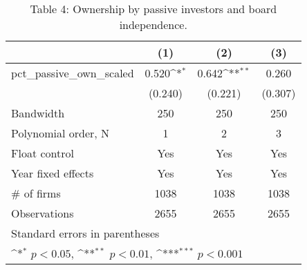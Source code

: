 \begin{table}[htbp]\centering
\def\sym#1{\ifmmode^{#1}\else\(^{#1}\)\fi}
\caption{Table 4: Ownership by passive investors and board independence.}
\begin{tabular}{l*{3}{c}}
\hline\hline
                    &\multicolumn{1}{c}{(1)}         &\multicolumn{1}{c}{(2)}         &\multicolumn{1}{c}{(3)}         \\
\hline
pct\_passive\_own\_scaled&       0.520\sym{*}  &       0.642\sym{**} &       0.260         \\
                    &     (0.240)         &     (0.221)         &     (0.307)         \\
\hline
Bandwidth           &         250         &         250         &         250         \\
Polynomial order, N &           1         &           2         &           3         \\
Float control       &         Yes         &         Yes         &         Yes         \\
Year fixed effects  &         Yes         &         Yes         &         Yes         \\
# of firms          &        1038         &        1038         &        1038         \\
Observations        &        2655         &        2655         &        2655         \\
\hline\hline
\multicolumn{4}{l}{\footnotesize Standard errors in parentheses}\\
\multicolumn{4}{l}{\footnotesize \sym{*} \(p<0.05\), \sym{**} \(p<0.01\), \sym{***} \(p<0.001\)}\\
\end{tabular}
\end{table}

